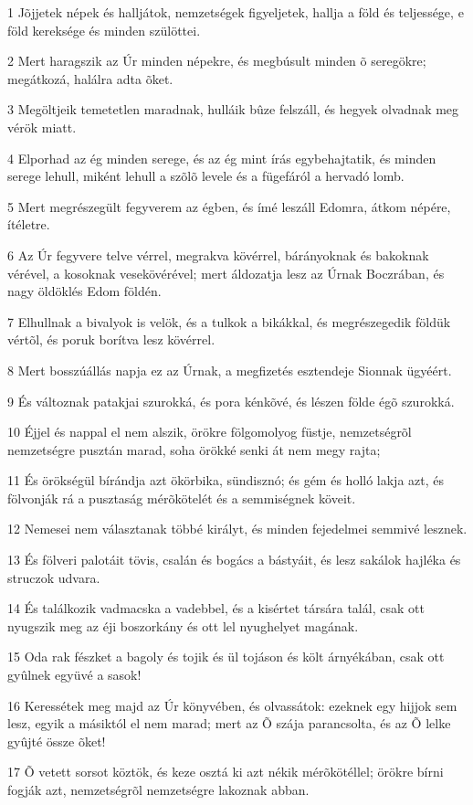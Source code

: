 \par 1 Jõjjetek népek és halljátok, nemzetségek figyeljetek, hallja a föld és teljessége, e föld kereksége és minden szülöttei.
\par 2 Mert haragszik az Úr minden népekre, és megbúsult minden õ seregökre; megátkozá, halálra adta õket.
\par 3 Megöltjeik temetetlen maradnak, hulláik bûze felszáll, és hegyek olvadnak meg vérök miatt.
\par 4 Elporhad az ég minden serege, és az ég mint írás egybehajtatik, és minden serege lehull, miként lehull a szõlõ levele és a fügefáról a hervadó lomb.
\par 5 Mert megrészegült fegyverem az égben, és ímé leszáll Edomra, átkom népére, ítéletre.
\par 6 Az Úr fegyvere telve vérrel, megrakva kövérrel, bárányoknak és bakoknak vérével, a kosoknak vesekövérével; mert áldozatja lesz az Úrnak Boczrában, és nagy öldöklés Edom földén.
\par 7 Elhullnak a bivalyok is velök, és a tulkok a bikákkal, és megrészegedik földük vértõl, és poruk borítva lesz kövérrel.
\par 8 Mert bosszúállás napja ez az Úrnak, a megfizetés esztendeje Sionnak ügyéért.
\par 9 És változnak patakjai szurokká, és pora kénkõvé, és lészen földe égõ szurokká.
\par 10 Éjjel és nappal el nem alszik, örökre fölgomolyog füstje, nemzetségrõl nemzetségre pusztán marad, soha örökké senki át nem megy rajta;
\par 11 És örökségül bírándja azt ökörbika, sündisznó; és gém és holló lakja azt, és fölvonják rá a pusztaság mérõkötelét és a semmiségnek köveit.
\par 12 Nemesei nem választanak többé királyt, és minden fejedelmei semmivé lesznek.
\par 13 És fölveri palotáit tövis, csalán és bogács a bástyáit, és lesz sakálok hajléka és struczok udvara.
\par 14 És találkozik vadmacska a vadebbel, és a kisértet társára talál, csak ott nyugszik meg az éji boszorkány és ott lel nyughelyet magának.
\par 15 Oda rak fészket a bagoly és tojik és ül tojáson és költ árnyékában, csak ott gyûlnek együvé a sasok!
\par 16 Keressétek meg majd az Úr könyvében, és olvassátok: ezeknek egy hijjok sem lesz, egyik a másiktól el nem marad; mert az Õ szája parancsolta, és az Õ lelke gyûjté össze õket!
\par 17 Õ vetett sorsot köztök, és keze osztá ki azt nékik mérõkötéllel; örökre bírni fogják azt, nemzetségrõl nemzetségre lakoznak abban.

